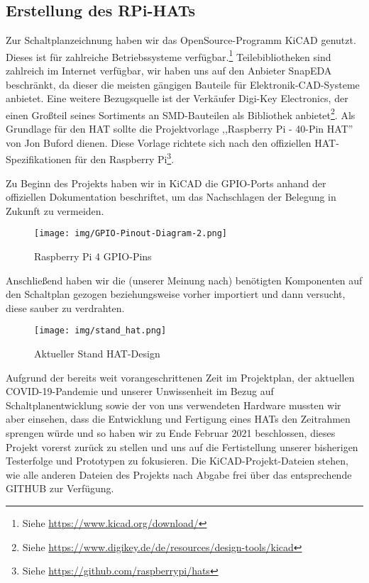 \subsection{Erstellung des RPi-HATs}\label{hw_hat}
Zur Schaltplanzeichnung haben wir das OpenSource-Programm KiCAD genutzt.
Dieses ist für zahlreiche Betriebssysteme verfügbar.\footnote{Siehe \url{https://www.kicad.org/download/}} 
Teilebibliotheken sind zahlreich im Internet verfügbar, wir haben uns auf den Anbieter SnapEDA beschränkt, da dieser die meisten gängigen Bauteile für Elektronik-CAD-Systeme anbietet. 
Eine weitere Bezugsquelle ist der Verkäufer Digi-Key Electronics, der einen Großteil seines Sortiments an SMD-Bauteilen als Bibliothek anbietet\footnote{Siehe \url{https://www.digikey.de/de/resources/design-tools/kicad}}. 
Als Grundlage für den HAT sollte die Projektvorlage ,,Raspberry Pi - 40-Pin HAT'' von Jon Buford dienen.
Diese Vorlage richtete sich nach den offiziellen HAT-Spezifikationen für den Raspberry Pi\footnote{Siehe \url{https://github.com/raspberrypi/hats}}.\par
\noindent Zu Beginn des Projekts haben wir in KiCAD die GPIO-Ports anhand der offiziellen Dokumentation beschriftet, um das Nachschlagen der Belegung in Zukunft zu vermeiden.
\begin{figure}[h!tb]
	\texttt{[image: img/GPIO-Pinout-Diagram-2.png]}
	\caption[Raspberry Pi 4 GPIO-Pins]{Raspberry Pi 4 GPIO-Pins}
	\label{rpi-gpio-pins}
\end{figure}
\par
\noindent Anschließend haben wir die (unserer Meinung nach) benötigten Komponenten auf den Schaltplan gezogen beziehungsweise vorher importiert und dann versucht, diese sauber zu verdrahten.\par
\begin{figure}[h!tb]
	\texttt{[image: img/stand\_hat.png]}
	\caption[Aktueller Stand HAT-Design]{Aktueller Stand HAT-Design}
	\label{hat-design}
\end{figure}
\noindent Aufgrund der bereits weit vorangeschrittenen Zeit im Projektplan, der aktuellen COVID-19-Pandemie und unserer Unwissenheit im Bezug auf Schaltplanentwicklung sowie der von uns verwendeten Hardware mussten wir aber einsehen, dass die Entwicklung und Fertigung eines HATs den Zeitrahmen sprengen würde und so haben wir zu Ende Februar 2021 beschlossen, dieses Projekt vorerst zurück zu stellen und uns auf die Fertistellung unserer bisherigen Testerfolge und Prototypen zu fokusieren.
Die KiCAD-Projekt-Dateien stehen, wie alle anderen Dateien des Projekts nach Abgabe frei über das entsprechende GITHUB zur Verfügung.\par